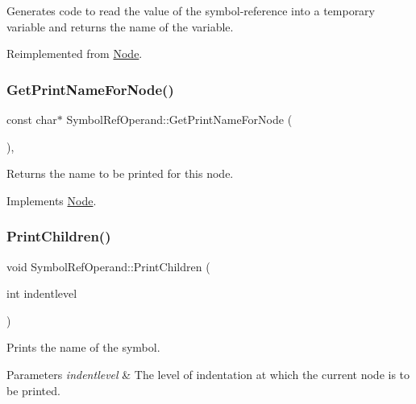 Generates code to read the value of the symbol-\/reference into a temporary variable and returns the name of the variable. 

Reimplemented from \hyperlink{class_node_acb60e526730e8436056375a3055c2c32}{Node}.

\mbox{\label{class_symbol_ref_operand_adb5689dfd85cd5da59ad1228f221a875}} 
\subsubsection{\texorpdfstring{Get\+Print\+Name\+For\+Node()}{GetPrintNameForNode()}}
{\footnotesize\ttfamily const char$\ast$ Symbol\+Ref\+Operand\+::\+Get\+Print\+Name\+For\+Node (\begin{DoxyParamCaption}{ }\end{DoxyParamCaption})\hspace{0.3cm}{\ttfamily [inline]}, {\ttfamily [virtual]}}

Returns the name to be printed for this node. 

Implements \hyperlink{class_node_a56e29657306ffb004d69c6929ae44269}{Node}.

\mbox{\label{class_symbol_ref_operand_a788a41e0bcf7a1047bb7884e0c8ac857}} 
\subsubsection{\texorpdfstring{Print\+Children()}{PrintChildren()}}
{\footnotesize\ttfamily void Symbol\+Ref\+Operand\+::\+Print\+Children (\begin{DoxyParamCaption}\item[{int}]{indentlevel }\end{DoxyParamCaption})\hspace{0.3cm}{\ttfamily [virtual]}}

Prints the name of the symbol. 
\begin{DoxyParams}{Parameters}
{\em indentlevel} & The level of indentation at which the current node is to be printed. \\
\hline
\end{DoxyParams}


